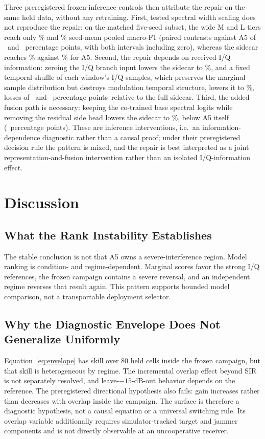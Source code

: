 \documentclass[letterpaper,journal]{IEEEtran}
\newcommand{\pp}{percentage points}
\begin{document}
Three preregistered frozen-inference controls then attribute the repair on
the same held data, without any retraining. First, tested spectral width
scaling does not reproduce the repair: on the matched five-seed subset, the
wide M and L tiers reach only \SevereControlLevelCapM\% and
\SevereControlLevelCapL\% seed-mean pooled macro-F1 (paired contrasts against
A5 of \SevereControlDiffCapM\ and \SevereControlDiffCapL\ \pp, with both
intervals including zero), whereas the sidecar reaches
\SevereControlMatchedLevelSidecar\% against
\SevereControlMatchedLevelAFive\% for A5.
Second, the repair depends on received-I/Q information: zeroing the I/Q branch
input lowers the sidecar to \SevereControlLevelIqZero\%, and a fixed temporal
shuffle of each window's I/Q samples, which preserves the marginal sample
distribution but destroys modulation temporal structure, lowers it to
\SevereControlLevelIqShuffle\%, losses of \SevereControlIqZeroLoss\ and
\SevereControlIqShuffleLoss\ \pp\ relative to the full sidecar. Third, the
added fusion path is necessary: keeping the co-trained base spectral logits
while removing the residual side head lowers the sidecar to
\SevereControlLevelNoSideHead\%, below A5 itself (\SevereControlDiffNoSideHead\
\pp). These are inference interventions, i.e.\ an information-dependence
diagnostic rather than a causal proof; under their preregistered decision
rule the pattern is mixed, and the repair is best interpreted as a joint
representation-and-fusion intervention rather than an isolated
I/Q-information effect.

\section{Discussion}
\subsection{What the Rank Instability Establishes}
The stable conclusion is not that A5 owns a severe-interference region. Model
ranking is condition- and regime-dependent. Marginal scores favor the strong
I/Q references, the frozen campaign contains a severe reversal, and an
independent regime reverses that result again. This pattern supports bounded
model comparison, not a transportable deployment selector.

\subsection{Why the Diagnostic Envelope Does Not Generalize Uniformly}
Equation~\eqref{eq:envelope} has skill over 80 held cells inside the frozen
campaign, but that skill is heterogeneous by regime. The incremental overlap
effect beyond SIR is not separately resolved, and leave-$-15$-dB-out behavior
depends on the reference. The preregistered directional hypothesis also fails:
gain increases rather than decreases with overlap inside the campaign. The
surface is therefore a diagnostic hypothesis, not a causal equation or a
universal switching rule. Its overlap variable additionally requires
simulator-tracked target and jammer components and is not directly observable
at an uncooperative receiver.
\end{document}
